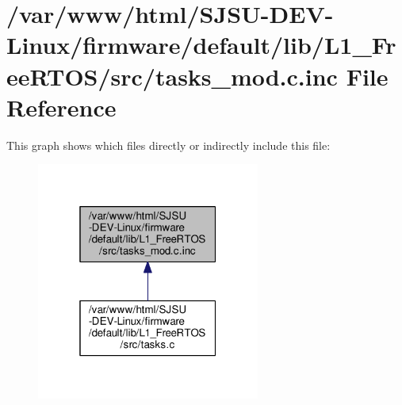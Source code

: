 \hypertarget{tasks__mod_8c_8inc}{}\section{/var/www/html/\+S\+J\+S\+U-\/\+D\+E\+V-\/\+Linux/firmware/default/lib/\+L1\+\_\+\+Free\+R\+T\+O\+S/src/tasks\+\_\+mod.c.\+inc File Reference}
\label{tasks__mod_8c_8inc}
This graph shows which files directly or indirectly include this file\+:\nopagebreak
\begin{figure}[H]
\begin{center}
\leavevmode
\includegraphics[width=208pt]{d1/d5b/tasks__mod_8c_8inc__dep__incl}
\end{center}
\end{figure}
